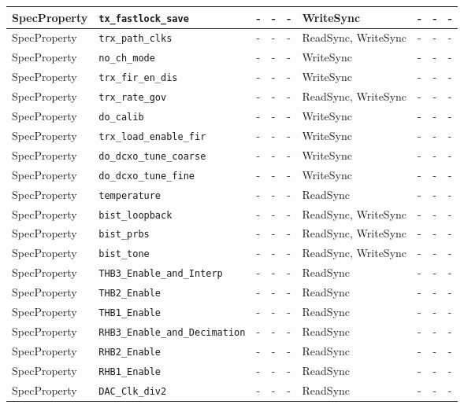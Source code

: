 \documentclass{article}
\begin{document}
\begin{landscape}
\begin{scriptsize}
\begin{longtable}{|p{2cm}|p{4cm}|p{1cm}|p{2cm}|p{2cm}|p{2cm}|p{2cm}|p{1cm}|p{4.58cm}|}
			\hline
			SpecProperty & \verb+tx_fastlock_save+ & - & - & - & WriteSync & - & - & - \\
			\hline
			SpecProperty & \verb+trx_path_clks+ & - & - & - & ReadSync, WriteSync & - & - & - \\
			\hline
			SpecProperty & \verb+no_ch_mode+ & - & - & - & WriteSync & - & - & - \\
			\hline
			SpecProperty & \verb+trx_fir_en_dis+ & - & - & - & WriteSync & - & - & - \\
			\hline
			SpecProperty & \verb+trx_rate_gov+ & - & - & - & ReadSync, WriteSync & - & - & - \\
			\hline
			SpecProperty & \verb+do_calib+ & - & - & - & WriteSync & - & - & - \\
			\hline
			SpecProperty & \verb+trx_load_enable_fir+ & - & - & - & WriteSync & - & - & - \\
			\hline
			SpecProperty & \verb+do_dcxo_tune_coarse+ & - & - & - & WriteSync & - & - & - \\
			\hline
			SpecProperty & \verb+do_dcxo_tune_fine+ & - & - & - & WriteSync & - & - & - \\
			\hline
			SpecProperty & \verb+temperature+ & - & - & - & ReadSync & - & - & - \\
			\hline
			SpecProperty & \verb+bist_loopback+ & - & - & - & ReadSync, WriteSync & - & - & - \\
			\hline
			SpecProperty & \verb+bist_prbs+ & - & - & - & ReadSync, WriteSync & - & - & - \\
			\hline
			SpecProperty & \verb+bist_tone+ & - & - & - & ReadSync, WriteSync & - & - & - \\
			\hline
			SpecProperty & \verb+THB3_Enable_and_Interp+ & - & - & - & ReadSync & - & - & - \\
			\hline
			SpecProperty & \verb+THB2_Enable+ & - & - & - & ReadSync & - & - & - \\
			\hline
			SpecProperty & \verb+THB1_Enable+ & - & - & - & ReadSync & - & - & - \\
			\hline
			SpecProperty & \verb+RHB3_Enable_and_Decimation+ & - & - & - & ReadSync & - & - & - \\
			\hline
			SpecProperty & \verb+RHB2_Enable+ & - & - & - & ReadSync & - & - & - \\
			\hline
			SpecProperty & \verb+RHB1_Enable+ & - & - & - & ReadSync & - & - & - \\
			\hline
			SpecProperty & \verb+DAC_Clk_div2+ & - & - & - & ReadSync & - & - & - \\

\end{longtable}
\end{scriptsize}
\end{landscape}
\end{document}
